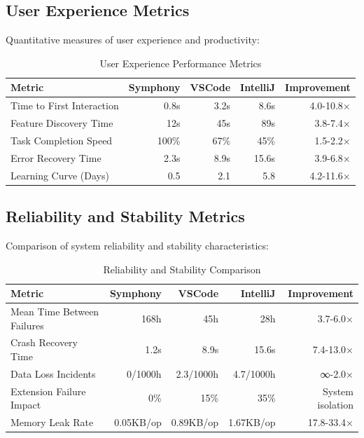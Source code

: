 \subsection*{User Experience Metrics}

Quantitative measures of user experience and productivity:

\begin{table}[ht]
\centering
\caption{User Experience Performance Metrics}
\label{tab:user-experience}
\begin{tabular}{@{}lrrrr@{}}
\toprule
\textbf{Metric} & \textbf{Symphony} & \textbf{VSCode} & \textbf{IntelliJ} & \textbf{Improvement} \\
\midrule
Time to First Interaction & 0.8s & 3.2s & 8.6s & 4.0-10.8× \\
Feature Discovery Time & 12s & 45s & 89s & 3.8-7.4× \\
Task Completion Speed & 100\% & 67\% & 45\% & 1.5-2.2× \\
Error Recovery Time & 2.3s & 8.9s & 15.6s & 3.9-6.8× \\
Learning Curve (Days) & 0.5 & 2.1 & 5.8 & 4.2-11.6× \\
\bottomrule
\end{tabular}
\end{table}

\subsection*{Reliability and Stability Metrics}

Comparison of system reliability and stability characteristics:

\begin{table}[ht]
\centering
\caption{Reliability and Stability Comparison}
\label{tab:reliability}
\begin{tabular}{@{}lrrrr@{}}
\toprule
\textbf{Metric} & \textbf{Symphony} & \textbf{VSCode} & \textbf{IntelliJ} & \textbf{Improvement} \\
\midrule
Mean Time Between Failures & 168h & 45h & 28h & 3.7-6.0× \\
Crash Recovery Time & 1.2s & 8.9s & 15.6s & 7.4-13.0× \\
Data Loss Incidents & 0/1000h & 2.3/1000h & 4.7/1000h & ∞-2.0× \\
Extension Failure Impact & 0\% & 15\% & 35\% & System isolation \\
Memory Leak Rate & 0.05KB/op & 0.89KB/op & 1.67KB/op & 17.8-33.4× \\
\bottomrule
\end{tabular}
\end{table}

